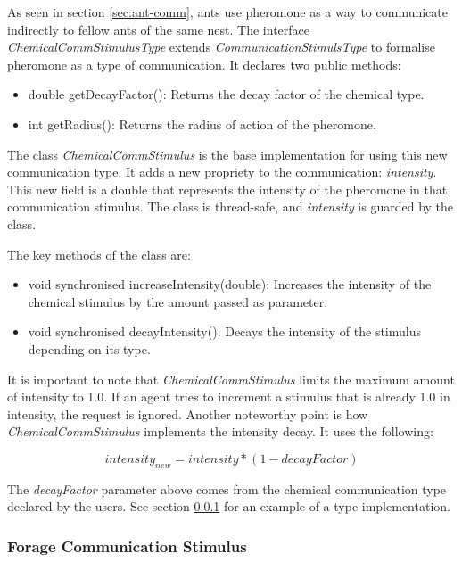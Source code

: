As seen in section \ref{sec:ant-comm}, ants use pheromone as a way to communicate indirectly to fellow ants of the same nest. The interface \emph{ChemicalCommStimulusType} extends \emph{CommunicationStimulsType} to formalise pheromone as a type of communication. It declares two public methods:

\begin{itemize}
  \item double getDecayFactor(): Returns the decay factor of the chemical type. 
  \item int getRadius(): Returns the radius of action of the pheromone.
\end{itemize}

The class \emph{ChemicalCommStimulus} is the base implementation for using this new communication type. It adds a new propriety to the communication: \emph{intensity}. This new field is a double that represents the intensity of the pheromone in that communication stimulus. The class is thread-safe, and \emph{intensity} is guarded by the class.

The key methods of the class are:

\begin{itemize}
  \item void synchronised increaseIntensity(double): Increases the intensity of the chemical stimulus by the amount passed as parameter.
  
  \item void synchronised decayIntensity(): Decays the intensity of the stimulus depending on its type.
\end{itemize}

It is important to note that \emph{ChemicalCommStimulus} limits the maximum amount of intensity to 1.0. If an agent tries to increment a stimulus that is already 1.0 in intensity, the request is ignored.
Another noteworthy point is how \emph{ChemicalCommStimulus} implements the intensity decay. It uses the following:

\begin{equation}
intensity_{new} = intensity * (1 - decayFactor)
\end{equation}

The \emph{decayFactor} parameter above comes from the chemical communication type declared by the users. See section \ref{subsec:forage-stimulus} for an example of a type implementation.

\subsubsection {Forage Communication Stimulus}
\label{subsec:forage-stimulus}

